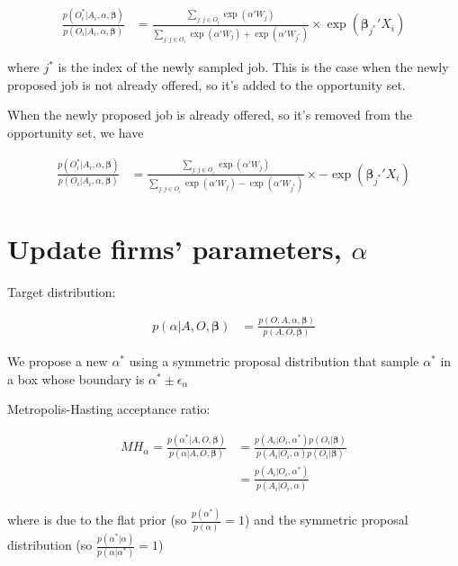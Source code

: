 \documentclass[12pt]{article}
\begin{document}
\begin{align}
\frac{p(O_i^* | A_i, \alpha, \bm{\beta})}{p(O_i | A_i, \alpha, \bm{\beta})} &= \frac{\sum\limits_{j:j \in O_i} \exp(\alpha'W_j)}{\sum\limits_{j:j \in O_i} \exp(\alpha'W_j) + \exp(\alpha' W_{j^*})} \times \exp(\bm{\beta}_{j^*}'X_i)
\end{align}

where $j^*$ is the index of the newly sampled job. This is the case when the newly proposed job is not already offered, so it's added to the opportunity set.

When the newly proposed job is already offered, so it's removed from the opportunity set, we have

\begin{align}
\frac{p(O_i^* | A_i, \alpha, \bm{\beta})}{p(O_i | A_i, \alpha, \bm{\beta})} &= \frac{\sum\limits_{j:j \in O_i} \exp(\alpha'W_j)}{\sum\limits_{j:j \in O_i} \exp(\alpha'W_j) - \exp(\alpha' W_{j^*})} \times -\exp(\bm{\beta}_{j^*}'X_i)
\end{align}

\section{Update firms' parameters, $\alpha$}

Target distribution:

\begin{align}
p(\alpha | A, O, \bm{\beta}) &= \frac{p(O, A, \alpha, \bm{\beta})}{p(A, O, \bm{\beta})}
\end{align}

We propose a new $\alpha^*$ using a symmetric proposal distribution that sample $\alpha^*$ in a box whose boundary is $\alpha^* \pm \epsilon_\alpha$

Metropolis-Hasting acceptance ratio:

\begin{align}
MH_\alpha = \frac{p(\alpha^* | A, O, \bm{\beta})}{p(\alpha | A, O, \bm{\beta})} &= \frac{p(A_i | O_i, \alpha^*)p(O_i|\bm{\beta})}{p(A_i | O_i, \alpha)p(O_i|\bm{\beta})} \\
&= \frac{p(A_i | O_i, \alpha^*)}{p(A_i | O_i, \alpha)} \label{eq:updatealpha_MHratio_final}
\end{align}

where  is due to the flat prior (so $\frac{p(\alpha^*)}{p(\alpha)}=1$) and the symmetric proposal distribution (so $\frac{p(\alpha^*|\alpha)}{p(\alpha|\alpha^*)} = 1$)
\end{document}
